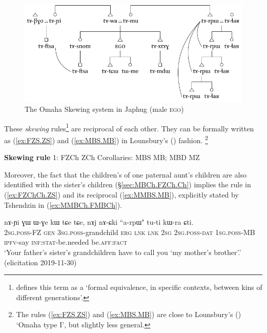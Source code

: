 \begin{figure}
\caption{The Omaha Skewing system in Japhug (male \textsc{ego})} \label{fig:omaha}
\includegraphics[width=\textwidth]{kinship-japhug-1.pdf}
\end{figure}
 
These \textit{skewing} rules\footnote{ \citet[357]{lounsbury64crow} defines this term as a `formal equivalence, in specific contexts, between kins of different generations'. } are reciprocal of each other.  They can be formally written as (\ref{ex:FZS.ZS}) and (\ref{ex:MBS.MB}) in Lounsbury's (\citeyear{lounsbury64crow}) fashion. \footnote{The rules (\ref{ex:FZS.ZS}) and (\ref{ex:MBS.MB}) are close to Lounsbury's (\citeyear[359]{lounsbury64crow}) `Omaha type I', but slightly less general. }
 
\begin{exe}
\ex 
\begin{xlist}
\ex \label{ex:FZS.ZS}
\glt \textbf{Skewing rule} 1: FZCh \fl{} ZCh
\ex \label{ex:MBS.MB}
\glt Corollaries:  MBS \fl{} MB; MBD \fl{} MZ
\end{xlist}
\end{exe}

Moreover, the fact that the children's of one paternal aunt's children are also identified with the sister's children (§\ref{sec:MBCh.FZCh.Ch}) implies the rule in (\ref{ex:FZChCh.ZS}) and its reciprocal (\ref{ex:MMBS.MB}), explicitly stated by Tshendzin in (\ref{ex:MMBCh.FMBCh}).

\begin{exe}
\ex \label{ex:MMBCh.FMBCh}
\gll nɤ-ɲi ɣɯ ɯ-ɣe kɯ tɕe tɕe, nɤj nɤ-ɕki ``a-rpɯ" tu-ti kɯ-ra ɕti. \\
\textsc{2sg}.\textsc{poss}-FZ \textsc{gen} \textsc{3sg}.\textsc{poss}-grandchild \textsc{erg} \textsc{lnk} \textsc{lnk} \textsc{2sg} \textsc{2sg}.\textsc{poss}-\textsc{dat} \textsc{1sg}.\textsc{poss}-MB \textsc{ipfv}-say \textsc{inf}:\textsc{stat}-be.needed be.\textsc{aff}:\textsc{fact} \\
\glt `Your father's sister's grandchildren have to call you `my mother's brother'.' (elicitation 2019-11-30)
\end{exe}

